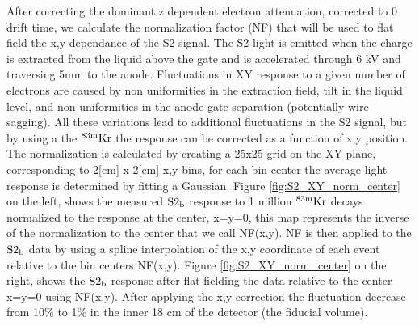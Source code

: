 After correcting the dominant z dependent electron attenuation, corrected to 0 drift time, we calculate the normalization factor (NF) that will be used to flat field the x,y dependance of the S2 signal. The S2 light is emitted when the charge is extracted from the liquid above the gate and is accelerated through 6 kV and traversing 5mm to the anode. Fluctuations in XY response to a given number of electrons are caused by non uniformities in the extraction field, tilt in the liquid level, and non uniformities in the anode-gate separation (potentially wire sagging). All these variations lead to additional fluctuations in the S2 signal, but by using a the $\rm^{83m}Kr$ the response can be corrected as a function of  x,y position. The normalization is calculated by creating a 25x25 grid on the XY plane, corresponding to 2[cm] x 2[cm] x,y bins, for each bin center the average light response is determined by fitting a Gaussian. Figure \ref{fig:S2_XY_norm_center} on the left, shows the measured $\rm S2_b$ response to 1 million $\rm^{83m}Kr$ decays normalized to the response at the center, x=y=0, this map represents the inverse of the normalization to the center that we call NF(x,y). NF is then applied to the $\rm S2_b$ data by using a spline interpolation of the x,y coordinate of each event relative to the bin centers NF(x,y). Figure \ref{fig:S2_XY_norm_center} on the right, shows the $\rm S2_b$ response after flat fielding the data relative to the center x=y=0 using NF(x,y). After applying the x,y correction the fluctuation decrease from 10\% to 1\% in the inner 18 cm of the detector (the fiducial volume).



